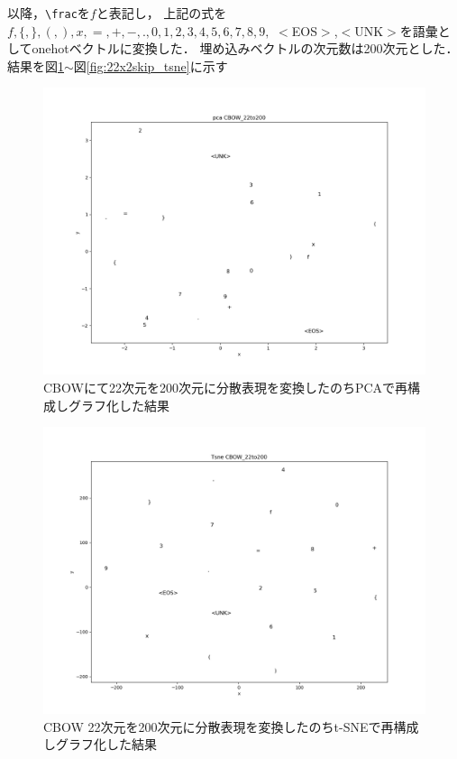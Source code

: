\documentclass[a4j,11pt,report]{jsbook}
\begin{document}
\begin{multicols}{2}
  \begin{quote}
  \end{quote}
\end{multicols}

以降，\verb#\frac#を$f$と表記し，
上記の式を$f,\{,\},(,),x,=,+,-,.,0,1,2,3,4,5,6,7,8,9,$ $<$EOS$>$,$<$UNK$>$を語彙としてonehotベクトルに変換した．
埋め込みベクトルの次元数は200次元とした．
結果を図\ref{fig:89x2cbow_pac}$\sim$図\ref{fig:22x2skip_tsne}に示す

\begin{center}
  \begin{figure}[H]
    \centering
    \includegraphics[width=0.8\linewidth]{image/CBOW_pca_out22_200.png}
    \caption{CBOWにて22次元を200次元に分散表現を変換したのちPCAで再構成しグラフ化した結果}
    \label{fig:89x2cbow_pac}
  \end{figure}
\end{center}


\begin{center}
  \begin{figure}[H]
    \centering
    \includegraphics[width=0.8\linewidth]{image/CBOW_tsne_out22_200.png}
    \caption{CBOW 22次元を200次元に分散表現を変換したのちt-SNEで再構成しグラフ化した結果}
    \label{fig:89x2cbow_tsne}
  \end{figure}
\end{center}
\end{document}
